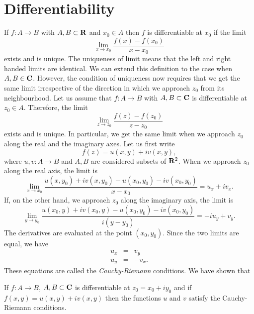 \section{Differentiability}\label{c2s2}
If $f: A \rightarrow B$ with $A, B \subset \mathbf{R}$ and $x_0 \in A$ then $f$
is differentiable at $x_0$ if the limit 
\[
\lim_{x \rightarrow x_0}\frac{f(x) - f(x_0)}{x - x_0}
\]
exists and is unique. The uniqueness of limit means that the left and right
handed limits are identical. We can extend this definition to the case when
$A, B \in \mathbf{C}$. However, the condition of uniqueness now requires that we
get the same limit irrespective of the direction in which we approach $z_0$
from its neighbourhood. Let us assume that $f: A \rightarrow B$ with $A, B
\subset \mathbf{C}$ is differentiable at $z_0 \in A$. Therefore, the limit
\[
\lim_{z \rightarrow z_0} \frac{f(z) - f(z_0)}{z - z_0}
\]
exists and is unique. In particular, we get the same limit when we approach
$z_0$ along the real and the imaginary axes. Let us first write
\[
f(z) = u(x, y) + iv(x, y),
\]
where $u, v: A \rightarrow B$ and $A, B$ are considered subsets of $\mathbf{R}^2$.
When we approach $z_0$ along the real axis, the limit is
\[
\lim_{x \rightarrow x_0} \frac{u(x,y_0)+iv(x,y_0) - u(x_0,y_0)-iv(x_0,y_0)}
{x-x_0} = u_x + iv_x.
\]
If, on the other hand, we approach $z_0$ along the imaginary axis, the limit
is
\[
\lim_{y \rightarrow y_0} \frac{u(x_0,y)+iv(x_0,y) - u(x_0,y_0)-iv(x_0,y_0)}
{i(y-y_0)} = -iu_y + v_y.
\]
The derivatives are evaluated at the point $(x_0, y_0)$. Since the two limits 
are equal, we have
\begin{eqnarray}
u_x &=& v_y \label{c2s2e1} \\
u_y &=& -v_x.\label{c2s2e2}
\end{eqnarray}
These equations are called the \emph{Cauchy-Riemann} conditions. We have
shown that
\begin{thm}\label{c2s2t1}
If $f:A \rightarrow B$, $A, B \subset \mathbf{C}$ is differentiable at $z_0 = x_0 + 
iy_0$ and if $f(x, y) = u(x, y) + iv(x, y)$ then the functions $u$ and $v$
satisfy the Cauchy-Riemann conditions.
\end{thm}

